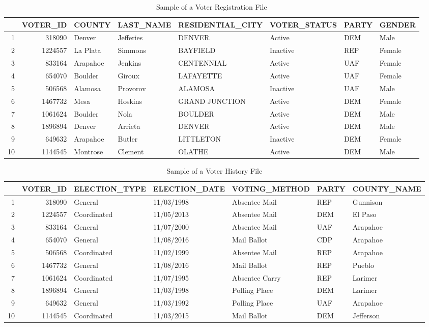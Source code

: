 \documentclass[12pt,twoside]{reedthesis}
\begin{document}
  \begin{sidewaystable}[ht]
  \centering
  \begin{tabular}{rrllllll}
    \toprule
   & VOTER\_ID & COUNTY & LAST\_NAME & RESIDENTIAL\_CITY & VOTER\_STATUS & PARTY & GENDER \\ 
    \midrule
  1 & 318090 & Denver & Jefferies & DENVER & Active & DEM & Male \\ 
    2 & 1224557 & La Plata & Simmons & BAYFIELD & Inactive & REP & Female \\ 
    3 & 833164 & Arapahoe & Jenkins & CENTENNIAL & Active & UAF & Female \\ 
    4 & 654070 & Boulder & Giroux & LAFAYETTE & Active & UAF & Female \\ 
    5 & 506568 & Alamosa & Provorov & ALAMOSA & Inactive & UAF & Male \\ 
    6 & 1467732 & Mesa & Hoskins & GRAND JUNCTION & Active & DEM & Female \\ 
    7 & 1061624 & Boulder & Nola & BOULDER & Active & DEM & Male \\ 
    8 & 1896894 & Denver & Arrieta & DENVER & Active & DEM & Male \\ 
    9 & 649632 & Arapahoe & Butler & LITTLETON & Inactive & DEM & Female \\ 
    10 & 1144545 & Montrose & Clement & OLATHE & Active & DEM & Male \\ 
     \bottomrule
  \end{tabular}
  \caption{Sample of a Voter Registration File \label{tab:vrf_sample}} 
  \end{sidewaystable}\begin{sidewaystable}[ht]
  \centering
  \begin{tabular}{rrlllll}
    \toprule
   & VOTER\_ID & ELECTION\_TYPE & ELECTION\_DATE & VOTING\_METHOD & PARTY & COUNTY\_NAME \\ 
    \midrule
  1 & 318090 & General & 11/03/1998 & Absentee Mail & REP & Gunnison \\ 
    2 & 1224557 & Coordinated & 11/05/2013 & Absentee Mail & DEM & El Paso \\ 
    3 & 833164 & General & 11/07/2000 & Absentee Mail & UAF & Arapahoe \\ 
    4 & 654070 & General & 11/08/2016 & Mail Ballot & CDP & Arapahoe \\ 
    5 & 506568 & Coordinated & 11/02/1999 & Absentee Mail & REP & Arapahoe \\ 
    6 & 1467732 & General & 11/08/2016 & Mail Ballot & REP & Pueblo \\ 
    7 & 1061624 & Coordinated & 11/07/1995 & Absentee Carry & REP & Larimer \\ 
    8 & 1896894 & General & 11/03/1998 & Polling Place & DEM & Larimer \\ 
    9 & 649632 & General & 11/03/1992 & Polling Place & UAF & Arapahoe \\ 
    10 & 1144545 & Coordinated & 11/03/2015 & Mail Ballot & DEM & Jefferson \\ 
     \bottomrule
  \end{tabular}
  \caption{Sample of a Voter History File \label{tab:vrf_sample}} 
  \end{sidewaystable}
  
\end{document}
